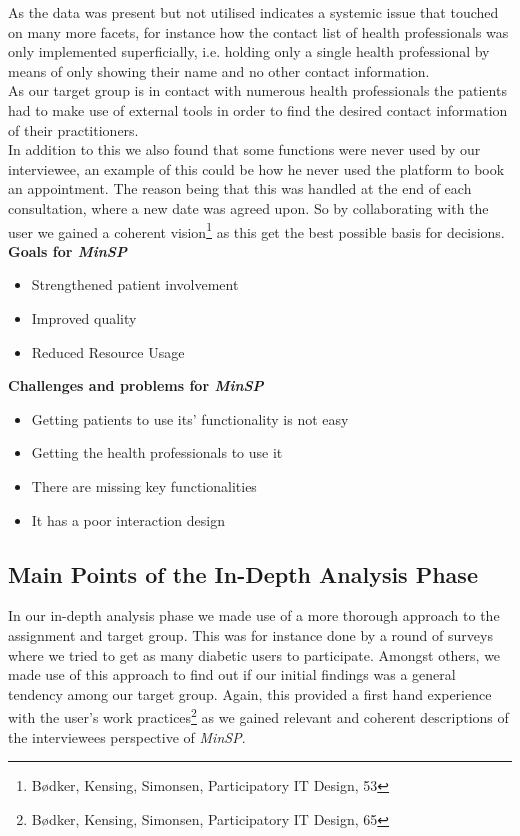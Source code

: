 \documentclass[a4paper,11pt]{article}
\begin{document}
As the data was present but not utilised indicates a systemic issue that touched on many more facets, for instance how the contact list of health professionals was only implemented superficially, i.e. holding only a single health professional by means of only showing their name and no other contact information.\\ 

As our target group is in contact with numerous health professionals the patients had to make use of external tools in order to find the desired contact information of their practitioners.\\

In addition to this we also found that some functions were never used by our interviewee, an example of this could be how he never used the platform to book an appointment. The reason being that this was handled at the end of each consultation, where a new date was agreed upon. So by collaborating with the user we gained a coherent vision\footnote{Bødker, Kensing, Simonsen, Participatory IT Design, 53} as this get the best possible basis for decisions.\\

\textbf{Goals for \textit{MinSP}}

\begin{itemize}
    \item Strengthened patient involvement
    \item Improved quality
    \item Reduced Resource Usage
\end{itemize}

\textbf{Challenges and problems for \textit{MinSP}}
\begin{itemize}
    \item Getting patients to use its' functionality is not easy
    \item Getting the health professionals to use it
    \item There are missing key functionalities
    \item It has a poor interaction design
\end{itemize}


\subsection{Main Points of the In-Depth Analysis Phase}
In our in-depth analysis phase we made use of a more thorough approach to the assignment and target group. This was for instance done by a round of surveys where we tried to get as many diabetic users to participate. Amongst others, we made use of this approach to find out if our initial findings was a general tendency among our target group. Again, this provided a first hand experience with the user's work practices\footnote{Bødker, Kensing, Simonsen, Participatory IT Design, 65} as we gained relevant and coherent descriptions of the interviewees perspective of \textit{MinSP}. \\
\end{document}
